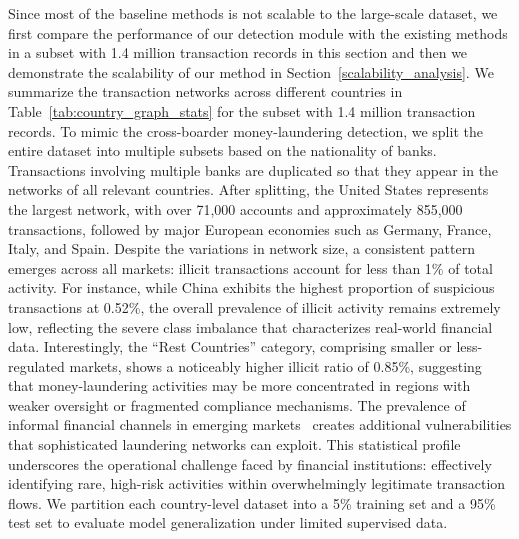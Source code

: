 \documentclass[11pt,english]{article}
\begin{document}
Since most of the baseline methods is not scalable to the large-scale dataset, we first compare the performance of our detection module with the existing methods in a subset with 1.4 million transaction records in this section and then we demonstrate the scalability of our method in Section~\ref{scalability_analysis}. We summarize the transaction networks across different countries in Table~\ref{tab:country_graph_stats} for the subset with 1.4 million transaction records. To mimic the cross-boarder money-laundering detection, we split the entire dataset into multiple subsets based on the nationality of banks. Transactions involving multiple banks are duplicated so that they appear in the networks of all relevant countries. After splitting, the United States represents the largest network, with over 71,000 accounts and approximately 855,000 transactions, followed by major European economies such as Germany, France, Italy, and Spain. Despite the variations in network size, a consistent pattern emerges across all markets: illicit transactions account for less than 1\% of total activity. For instance, while China exhibits the highest proportion of suspicious transactions at 0.52\%, the overall prevalence of illicit activity remains extremely low, reflecting the severe class imbalance that characterizes real-world financial data. Interestingly, the “Rest Countries” category, comprising smaller or less-regulated markets, shows a noticeably higher illicit ratio of 0.85\%, suggesting that money-laundering activities may be more concentrated in regions with weaker oversight or fragmented compliance mechanisms. The prevalence of informal financial channels in emerging markets~\parencite{bao2018nisingh} creates additional vulnerabilities that sophisticated laundering networks can exploit. This statistical profile underscores the operational challenge faced by financial institutions: effectively identifying rare, high-risk activities within overwhelmingly legitimate transaction flows. We partition each country-level dataset into a 5\% training set and a 95\% test set to evaluate model generalization under limited supervised data. 
\end{document}
